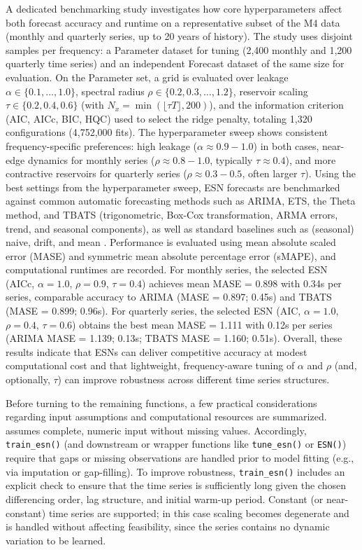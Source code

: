 A dedicated benchmarking study \citep{Haeusser2026} investigates how core hyperparameters affect both forecast accuracy and runtime on a representative subset of the M4 data (monthly and quarterly series, up to 20 years of history). The study uses disjoint samples per frequency: a Parameter dataset for tuning (2,400 monthly and 1,200 quarterly time series) and an independent Forecast dataset of the same size for evaluation. On the Parameter set, a grid is evaluated over leakage \(\alpha \in \{0.1,\dots,1.0\}\), spectral radius \(\rho \in \{0.2,0.3,\dots,1.2\}\), reservoir scaling \(\tau \in \{0.2,0.4,0.6\}\) (with \(N_x =\min(\lfloor\tau T\rfloor,200)\)), and the information criterion (AIC, AICc, BIC, HQC) used to select the ridge penalty, totaling 1,320 configurations (4,752,000 fits). The hyperparameter sweep shows consistent frequency-specific preferences: high leakage (\(\alpha \approx 0.9 - 1.0\)) in both cases, near-edge dynamics for monthly series (\(\rho \approx 0.8 - 1.0\), typically \(\tau \approx 0.4\)), and more contractive reservoirs for quarterly series (\(\rho \approx 0.3 - 0.5\), often larger \(\tau\)). Using the best settings from the hyperparameter sweep, ESN forecasts are benchmarked against common automatic forecasting methods such as ARIMA, ETS, the Theta method, and TBATS (trigonometric, Box-Cox transformation, ARMA errors, trend, and seasonal components), as well as standard baselines such as (seasonal) naive, drift, and mean \citep{Hyndman2021}. Performance is evaluated using mean absolute scaled error (MASE) and symmetric mean absolute percentage error (sMAPE), and computational runtimes are recorded. For monthly series, the selected ESN (AICc, \(\alpha = 1.0\), \(\rho = 0.9\), \(\tau = 0.4\)) achieves mean MASE = 0.898 with 0.34s per series, comparable accuracy to ARIMA (MASE = 0.897; 0.45s) and TBATS (MASE = 0.899; 0.96s). For quarterly series, the selected ESN (AIC, \(\alpha = 1.0\), \(\rho = 0.4\), \(\tau = 0.6\)) obtains the best mean MASE = 1.111 with 0.12s per series (ARIMA MASE = 1.139; 0.13s; TBATS MASE = 1.160; 0.51s). Overall, these results indicate that ESNs can deliver competitive accuracy at modest computational cost and that lightweight, frequency-aware tuning of \(\alpha\) and \(\rho\) (and, optionally, \(\tau\)) can improve robustness across different time series structures.

Before turning to the remaining functions, a few practical considerations regarding input assumptions and computational resources are summarized.  assumes complete, numeric input without missing values. Accordingly, \texttt{train\_esn()} (and downstream or wrapper functions like \texttt{tune\_esn()} or \texttt{ESN()}) require that gaps or missing observations are handled prior to model fitting (e.g., via imputation or gap-filling). To improve robustness, \texttt{train\_esn()} includes an explicit check to ensure that the time series is sufficiently long given the chosen differencing order, lag structure, and initial warm-up period. Constant (or near-constant) time series are supported; in this case scaling becomes degenerate and is handled without affecting feasibility, since the series contains no dynamic variation to be learned.

